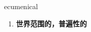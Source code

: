 
\begin{frame}
{\huge ecumenical}
\begin{center}
\begin{enumerate}\Large
  \item \textbf{世界范围的，普遍性的}
\end{enumerate}
\end{center}
\end{frame}
